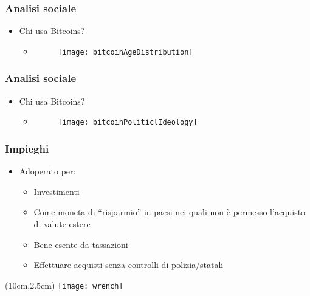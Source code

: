 \begin{frame}
 \frametitle{Analisi sociale}

 \begin{itemize}
  \item Chi usa Bitcoins?
  \begin{itemize}
   \item[]
   \begin{figure}
    \centering
    \texttt{[image: bitcoinAgeDistribution]}
   \end{figure}

  \end{itemize}

 \end{itemize}

\end{frame}


\begin{frame}
 \frametitle{Analisi sociale}

 \begin{itemize}
  \item Chi usa Bitcoins?
  \begin{itemize}
   \item[]
   \begin{figure}
    \centering
    \texttt{[image: bitcoinPoliticlIdeology]}
   \end{figure}

  \end{itemize}

 \end{itemize}

\end{frame}


\begin{frame}
 \frametitle{Impieghi}

 \begin{itemize}
  \item<1-> Adoperato per:
  \begin{itemize}
   \item<2-> Investimenti
   \item<3-> Come moneta di ``risparmio'' in paesi nei quali non \`e permesso
l'acquisto di valute estere
   \item<4-> Bene esente da tassazioni
   \item<5-> Effettuare acquisti senza controlli di polizia/statali
  \end{itemize}

 \end{itemize}


 \begin{textblock*}{5cm}(10cm,2.5cm)
  \texttt{[image: wrench]}
 \end{textblock*}

\end{frame}
